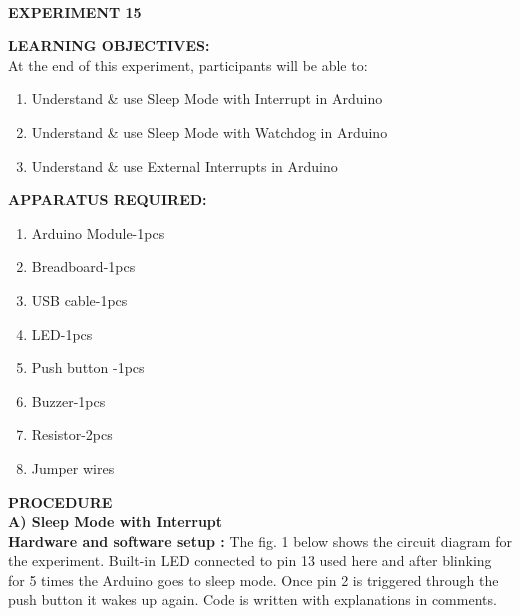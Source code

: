 \documentclass[12pt,a4paper]{article}
\begin{document}
\begin{center}

\textbf{\large \\EXPERIMENT 15 }\\[6pt]
\end{center}

\textbf{\large LEARNING OBJECTIVES:}\\[3pt]
At the end of this experiment, participants will be able to:\vspace{-6mm}\begin{enumerate}
 \setlength\itemsep{-0.3em}
\item Understand \& use Sleep Mode with Interrupt in Arduino\\
\item Understand \& use Sleep Mode with Watchdog in Arduino\\ 
\item Understand \& use External Interrupts in Arduino
\end{enumerate}
\textbf{\large APPARATUS REQUIRED:}\\
\vspace{-3mm}
\begin{enumerate}
 \setlength\itemsep{-0.3em}
\item Arduino Module-1pcs \\
\item Breadboard-1pcs\\
\item USB cable-1pcs\\
\item LED-1pcs\\
\item Push button -1pcs\\
\item Buzzer-1pcs\\
\item Resistor-2pcs\\
\item Jumper wires\\
\end{enumerate}

\begin{justify}
\textbf{\large PROCEDURE}\\[3pt]
\textbf{A)	Sleep Mode with Interrupt }\\[3pt]
\textbf{Hardware and software setup :} The fig. 1 below shows the circuit diagram for the experiment. Built-in LED connected to pin 13 used here and after blinking for 5 times the Arduino goes to sleep mode. Once pin 2 is triggered through the push button it wakes up again. Code is written with explanations in comments.\end{justify}
\end{document}

